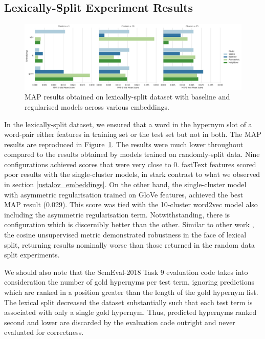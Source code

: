 \subsection{Lexically-Split Experiment Results}
\begin{figure}[ht!] 
  \centering
  \includegraphics[width=1.\linewidth]{images/MAP_lexical_split_results_models_baseline_embeddings.png}
  \caption{\ac{MAP} results obtained on lexically-split dataset with baseline and regularised models across various embeddings.}
  \label{fig:lexsplit_ustalov_map}
\end{figure}
In the lexically-split dataset, we ensured that a word in the hypernym slot of a word-pair either features in training set or the test set but not in both.  The \ac{MAP} results are reproduced in Figure~\ref{fig:lexsplit_ustalov_map}.  The results were much lower throughout compared to the results obtained by models trained on randomly-split data.  Nine configurations achieved scores that were very close to 0.  fastText features scored poor results with the single-cluster models, in stark contrast to what we observed in section \ref{ustalov_embeddings}.  On the other hand, the single-cluster model with asymmetric regularisation trained on GloVe features, achieved the best \ac{MAP} result (0.029).  This score was tied with the 10-cluster word2vec model also including the asymmetric regularisation term.  Notwithstanding, there is configuration which is discernibly better than the other.  Similar to other work \citep{shwartz2017siege}, the cosine unsupervised metric demonstrated robustness in the face of lexical split, returning results nominally worse than those returned in the random data split experiments.

We should also note that the SemEval-2018 Task 9 evaluation code takes into consideration the number of gold hypernyms per test term, ignoring predictions which are ranked in a position greater than the length of the gold hypernym list.  The lexical split decreased the dataset substantially such that each test term is associated with only a single gold hypernym.  Thus, predicted hypernyms ranked second and lower are discarded by the evaluation code outright and never evaluated for correctness.  

